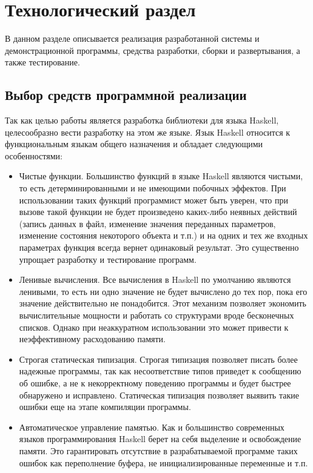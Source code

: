 \chapter{Технологический раздел}

В данном разделе описывается реализация разработанной системы и демонстрационной программы, средства разработки, сборки и развертывания, а также тестирование.

\section{Выбор средств программной реализации}

Так как целью работы является разработка библиотеки для языка Haskell, целесообразно вести разработку на этом же языке. Язык Haskell относится к функциональным языкам общего назначения и обладает следующими особенностями:

\begin{itemize}
\item Чистые функции. Большинство функций в языке Haskell являются чистыми, то есть детерминированными и не имеющими побочных эффектов. При использовании таких функций программист может быть уверен, что при вызове такой функции не будет произведено каких-либо неявных действий (запись данных в файл, изменение значения переданных параметров, изменение состояния некоторого объекта и т.п.) и на одних и тех же входных параметрах функция всегда вернет одинаковый результат. Это существенно упрощает разработку и тестирование программ.

\item Ленивые вычисления. Все вычисления в Haskell по умолчанию являются ленивыми, то есть ни одно значение не будет вычислено до тех пор, пока его значение действительно не понадобится. Этот механизм позволяет экономить вычислительные мощности и работать со структурами вроде бесконечных списков. Однако при неаккуратном использовании это может привести к неэффективному расходованию памяти.

\item Строгая статическая типизация. Строгая типизация позволяет писать более надежные программы, так как несоответствие типов приведет к сообщению об ошибке, а не к некорректному поведению программы и будет быстрее обнаружено и исправлено. Статическая типизация позволяет выявить такие ошибки еще на этапе компиляции программы.

\item Автоматическое управление памятью. Как и большинство современных языков программирования Haskell берет на себя выделение и освобождение памяти. Это гарантировать отсутствие в разрабатываемой программе таких ошибок как переполнение буфера, не инициализированные переменные и т.п.

\end{itemize}

